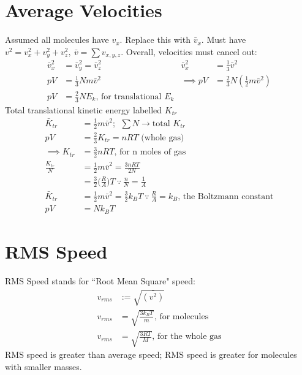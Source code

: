 \documentclass[a4paper, 11pt, normalem]{report}
\begin{document}
\section{Average Velocities}
Assumed all molecules have $v_{x}$.
Replace this with $\bar{v}_{x}$.
Must have $v^{2} = v_{x}^{2} + v_{y}^{2} + v_{z}^{2},~ \bar{v} = \sum v_{x,y,z}$.
Overall, velocities must cancel out:
\begin{align}
    \bar{v}_{x}^{2} &= \bar{v}_{y}^{2} = \bar{v}_{z}^{2} & \bar{v}_{x}^{2} &= \frac{1}{3}\bar{v}^{2} \\
    pV &= \frac{1}{3}Nm\bar{v}^{2} & \implies pV &= \frac{2}{3}N(\frac{1}{2}m\bar{v}^{2}) \\
    pV &= \frac{2}{3}NE_{k} \text{, for translational }E_{k} & 
\end{align}
Total translational kinetic energy labelled $K_{tr}$
\begin{align}
    \bar{K}_{tr} &= \frac{1}{2}m\bar{v}^{2};~~ \sum N \rightarrow \text{total }K_{tr} \\
    pV &= \frac{2}{3}K_{tr} = nRT \text{ (whole gas)} \\
    \implies K_{tr} &= \frac{3}{2}nRT\text{, for n moles of gas} \\
    \frac{K_{tr}}{N} &= \frac{1}{2}m\bar{v}^{2} = \frac{3nRT}{2N} \\
                     &= \frac{3}{2}\Big(\frac{R}{A}\Big)T ~\because~ \frac{n}{N} = \frac{1}{A} \\
    \bar{K}_{tr} &= \frac{1}{2}m\bar{v}^{2} = \frac{3}{2}k_{B}T ~\because~ \frac{R}{A} = k_{B}\text{, the Boltzmann constant} \\
    pV &= Nk_{B}T
\end{align}

\section{RMS Speed}
RMS Speed stands for ``Root Mean Square" speed:
\begin{align}
    v_{rms} &:= \sqrt{\bar{(v^{2})}} \\
    v_{rms} &= \sqrt{\frac{3k_{B}T}{m}}\text{, for molecules} \\
    v_{rms} &= \sqrt{\frac{3RT}{M}}\text{, for the whole gas}
\end{align}
RMS speed is greater than average speed; RMS speed is greater for molecules with smaller masses.
\end{document}
